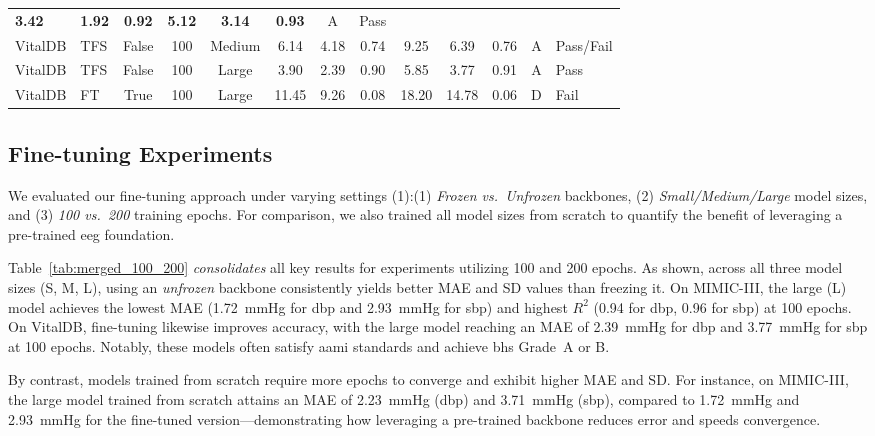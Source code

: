\begin{table*}[ht!]
{\begin{tabular}{llccccccccccl}
\textbf{3.42} & \textbf{1.92} & \textbf{0.92} & \textbf{5.12} & \textbf{3.14} & \textbf{0.93} & A & Pass \\
\cmidrule(lr){2-13}
VitalDB & TFS & False & 100 & Medium &
6.14 & 4.18 & 0.74 & 9.25 & 6.39 & 0.76 & A & Pass/Fail \\
VitalDB & TFS & False & 100 & Large &
3.90 & 2.39 & 0.90 & 5.85 & 3.77 & 0.91 & A & Pass \\
\cmidrule(lr){2-13}
VitalDB & FT & True & 100 & Large &
11.45 & 9.26 & 0.08 & 18.20 & 14.78 & 0.06 & D & Fail \\
\bottomrule
\end{tabular}
}
\vspace{-0.5cm}
\end{table*}

\subsection{Fine-tuning Experiments}\label{subsec:finetune_results}

We evaluated our fine-tuning approach under varying settings (1):(1) \textit{Frozen vs.\ Unfrozen} backbones, (2) \textit{Small/Medium/Large} model sizes, and (3) \textit{100 vs.\ 200} training epochs. For comparison, we also trained all model sizes from scratch to quantify the benefit of leveraging a pre-trained \gls{eeg} foundation. 

Table~\ref{tab:merged_100_200} \emph{consolidates} all key results for experiments utilizing 100 and 200 epochs. As shown, across all three model sizes (S, M, L), using an \emph{unfrozen} backbone consistently yields better MAE and SD values than freezing it. On MIMIC-III, the large (L) model achieves the lowest MAE (1.72~mmHg for \gls{dbp} and 2.93~mmHg for \gls{sbp}) and highest $R^2$ (0.94 for \gls{dbp}, 0.96 for \gls{sbp}) at 100 epochs. On VitalDB, fine-tuning likewise improves accuracy, with the large model reaching an MAE of 2.39~mmHg for \gls{dbp} and 3.77~mmHg for \gls{sbp} at 100 epochs. Notably, these models often satisfy \gls{aami} standards and achieve \gls{bhs} Grade~A or B.

By contrast, models trained from scratch require more epochs to converge and exhibit higher MAE and SD. For instance, on MIMIC-III, the large model trained from scratch attains an MAE of 2.23~mmHg (\gls{dbp}) and 3.71~mmHg (\gls{sbp}), compared to 1.72~mmHg and 2.93~mmHg for the fine-tuned version—demonstrating how leveraging a pre-trained backbone reduces error and speeds convergence.


